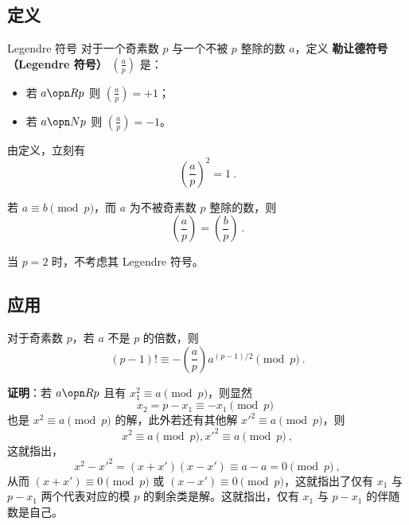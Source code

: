 
\subsection{定义}
\begin{definition}{Legendre 符号}
对于一个奇素数 $p$ 与一个不被 $p$ 整除的数 $a$，定义 \textbf{勒让德符号（Legendre 符号）} $\left( \frac{a}{p} \right)$ 是：
\begin{itemize}
\item 若 $a \opn R p$ 则 $\left( \frac{a}{p} \right) = +1$；
\item 若 $a \opn N p$ 则 $\left( \frac{a}{p} \right) = -1$。
\end{itemize}
\end{definition}

\begin{corollary}{}
由定义，立刻有
\begin{equation}
\left(\frac ap\right) ^2 = 1 ~.
\end{equation}

\end{corollary}

\begin{corollary}{}
若 $a \equiv b \pmod p$，而 $a$ 为不被奇素数 $p$ 整除的数，则
\begin{equation}
\left(\frac ap \right) = \left(\frac bp \right) ~.
\end{equation}

\end{corollary}

当 $p=2$ 时，不考虑其 Legendre 符号。

\subsection{应用}
\begin{theorem}{}\label{the_legnnt_1}
对于奇素数 $p$，若 $a$ 不是 $p$ 的倍数，则
\begin{equation}
(p-1)! \equiv -\left(\frac ap\right) a^{(p-1)/2} \pmod p ~.
\end{equation}
\end{theorem}
\textbf{证明}：若 $a \opn R p$ 且有 $x_1^2 \equiv a \pmod p$，则显然
\begin{equation}
x_2 = p-x_1 \equiv -x_1 \pmod p ~~
\end{equation}
也是 $x^2 \equiv a \pmod p$ 的解，此外若还有其他解 $x'^2 \equiv a \pmod p$，则
\begin{equation}
x^2 \equiv a \pmod p, x'^2 \equiv a \pmod p ~,
\end{equation}
这就指出，
\begin{equation}
x^2 - x'^2 = (x+x')(x-x') \equiv a - a = 0 \pmod p ~,
\end{equation}
从而 $(x+x') \equiv 0 \pmod p$ 或 $(x-x') \equiv 0 \pmod p$，这就指出了仅有 $x_1$ 与 $p-x_1$ 两个代表对应的模 $p$ 的剩余类是解。这就指出，仅有 $x_1$ 与 $p-x_1$ 的伴随数是自己。

